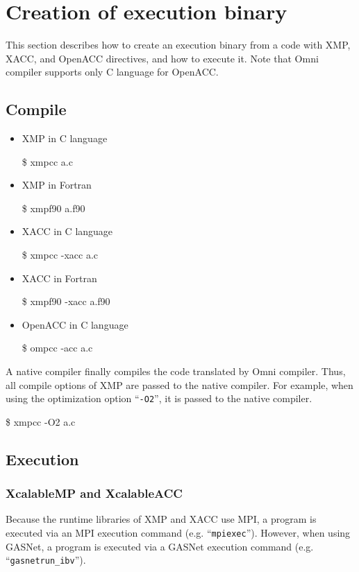\documentclass[graybox]{svmult}
\begin{document}
\section{Creation of execution binary}
This section describes how to create an execution binary from a code with XMP, XACC, and OpenACC directives, and how to execute it.
Note that Omni compiler supports only C language for OpenACC.
\subsection{Compile}
\begin{itemize}
\item XMP in C language
\begin{svgraybox}
\$ xmpcc a.c
\end{svgraybox}
\item XMP in Fortran
\begin{svgraybox}
\$ xmpf90 a.f90
\end{svgraybox}
\item XACC in C language
\begin{svgraybox}
\$ xmpcc -xacc a.c
\end{svgraybox}
\item XACC in Fortran
\begin{svgraybox}
\$ xmpf90 -xacc a.f90
\end{svgraybox}
\item OpenACC in C language
\begin{svgraybox}
\$ ompcc -acc a.c
\end{svgraybox}
\end{itemize}

A native compiler finally compiles the code translated by Omni compiler.
Thus, all compile options of XMP are passed to the native compiler. 
For example, when using the optimization option ``{\tt -O2}'', it is passed to the native compiler.

\begin{svgraybox}
\$ xmpcc -O2 a.c
\end{svgraybox}

\subsection{Execution}
\subsubsection{XcalableMP and XcalableACC}
Because the runtime libraries of XMP and XACC use MPI, 
 a program is executed via an MPI execution command (e.g. ``{\tt mpiexec}'').
However, when using GASNet, 
 a program is executed via a GASNet execution command (e.g. ``{\tt gasnetrun\_ibv}'').
\end{document}
